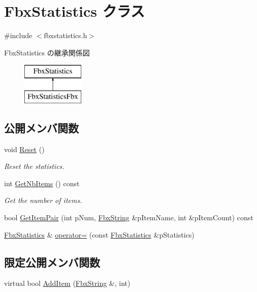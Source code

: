 \hypertarget{class_fbx_statistics}{}\section{Fbx\+Statistics クラス}
\label{class_fbx_statistics}


{\ttfamily \#include $<$fbxstatistics.\+h$>$}

Fbx\+Statistics の継承関係図\begin{figure}[H]
\begin{center}
\leavevmode
\includegraphics[height=2.000000cm]{class_fbx_statistics}
\end{center}
\end{figure}
\subsection*{公開メンバ関数}
\begin{DoxyCompactItemize}
\item 
void \hyperlink{class_fbx_statistics_ad0cf2f0dafc61cb5c99b8ad63d86f0c7}{Reset} ()
\begin{DoxyCompactList}\small\item\em Reset the statistics. \end{DoxyCompactList}\item 
int \hyperlink{class_fbx_statistics_a6e2b88a54e55a02e714707366fc44cd5}{Get\+Nb\+Items} () const
\begin{DoxyCompactList}\small\item\em Get the number of items. \end{DoxyCompactList}\item 
bool \hyperlink{class_fbx_statistics_a20877448d6ff61b050ea6d94554fa719}{Get\+Item\+Pair} (int p\+Num, \hyperlink{class_fbx_string}{Fbx\+String} \&p\+Item\+Name, int \&p\+Item\+Count) const
\item 
\hyperlink{class_fbx_statistics}{Fbx\+Statistics} \& \hyperlink{class_fbx_statistics_a176871e5e6bf03a71a2ae7f4dd277403}{operator=} (const \hyperlink{class_fbx_statistics}{Fbx\+Statistics} \&p\+Statistics)
\end{DoxyCompactItemize}
\subsection*{限定公開メンバ関数}
\begin{DoxyCompactItemize}
\item 
virtual bool \hyperlink{class_fbx_statistics_abd81e5b31d33546ad6ba5fa9af34c792}{Add\+Item} (\hyperlink{class_fbx_string}{Fbx\+String} \&, int)
\end{DoxyCompactItemize}
